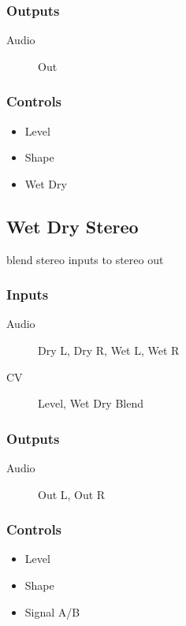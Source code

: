 \subsubsection{Outputs}
\begin{description}
\item [Audio] Out
\end{description}

\subsubsection{Controls}
\begin{itemize}
\item Level
\item Shape
\item Wet Dry
\end{itemize}

\subsection{Wet Dry Stereo}

blend stereo inputs to stereo out



\subsubsection{Inputs}
\begin{description}
\item [Audio] Dry L, Dry R, Wet L, Wet R
\item [CV] Level, Wet Dry Blend
\end{description}

\subsubsection{Outputs}
\begin{description}
\item [Audio] Out L, Out R
\end{description}

\subsubsection{Controls}
\begin{itemize}
\item Level
\item Shape
\item Signal A/B
\end{itemize}

